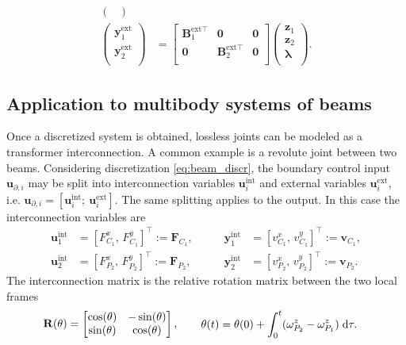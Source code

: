 \begin{align*}
\begin{pmatrix}
\end{pmatrix} \\
\begin{pmatrix}
\mathbf{y}_1^{\text{ext}} \\ \mathbf{y}_2^{\text{ext}} \\
\end{pmatrix}  &= \begin{bmatrix}
\mathbf{B}_1^{\text{ext} \top} & \mathbf{0} & \mathbf{0} \\
\mathbf{0} & \mathbf{B}_2^{\text{ext} \top} & \mathbf{0} \\
\end{bmatrix} \begin{pmatrix}
\mathbf{z}_1 \\ 
\mathbf{z}_2 \\
\bm{\lambda} \\
\end{pmatrix}.
\end{align*}



\subsection{Application to multibody systems of beams}
\label{sec:int_beams}
Once a discretized system is obtained, lossless joints can be modeled as a transformer interconnection. A common example is a revolute joint between two beams. Considering discretization \eqref{eq:beam_discr}, the boundary control input $\mathbf{u}_{\partial, i}$ may be split into interconnection variables $\mathbf{u}_i^{\text{int}}$ and external variables  $\mathbf{u}_i^{\text{ext}}$, i.e. $\mathbf{u}_{\partial, i} = [\mathbf{u}_i^{\text{int}}; \ \mathbf{u}_i^{\text{ext}}]$. The same splitting applies to the output. In this case the interconnection variables are
\begin{equation*}
\begin{aligned}
\mathbf{u}_1^{\text{int}} &= [F^x_{C_1}, \, F^y_{C_1}]^\top := \mathbf{F}_{C_1}, \\
\mathbf{u}_2^{\text{int}} &= [F^x_{P_2}, \, F^y_{P_2}]^\top := \mathbf{F}_{P_2},
\end{aligned} \qquad
\begin{aligned}
\mathbf{y}_1^{\text{int}} &= [v^x_{C_1}, \, v^y_{C_1}]^\top := \mathbf{v}_{C_1}, \\
\mathbf{y}_2^{\text{int}} &= [v^x_{P_2}, \, v^y_{P_2}]^\top := \mathbf{v}_{P_2}.
\end{aligned}
\end{equation*}
The interconnection matrix is the relative rotation matrix between the two local frames
\begin{equation}
\mathbf{R}(\theta) = \begin{bmatrix}
\cos(\theta) & - \sin(\theta) \\
\sin(\theta) & \cos(\theta) \\
\end{bmatrix}, \qquad 
\begin{aligned}
\theta(t) &= \theta(0) + \int_{0}^t (\omega^z_{P_2} - \omega^z_{P_1}) \d{\tau}.
\end{aligned}
\end{equation}

